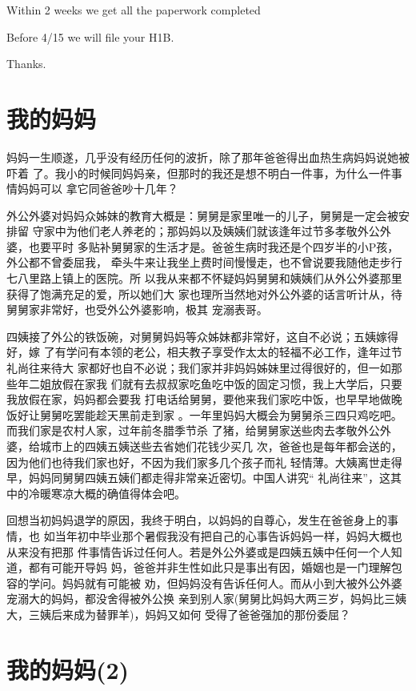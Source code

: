 \documentclass[12pt]{book}
\begin{document}
Within 2 weeks we get all the paperwork completed

Before 4/15 we will file your H1B.

Thanks.

\section{我的妈妈}
\label{sec-9-52}

妈妈一生顺遂，几乎没有经历任何的波折，除了那年爸爸得出血热生病妈妈说她被吓着
了。我小的时候同妈妈亲，但那时的我还是想不明白一件事，为什么一件事情妈妈可以
拿它同爸爸吵十几年？

外公外婆对妈妈众姊妹的教育大概是：舅舅是家里唯一的儿子，舅舅是一定会被安排留
守家中为他们老人养老的；那妈妈以及姨姨们就该逢年过节多孝敬外公外婆，也要平时
多贴补舅舅家的生活才是。爸爸生病时我还是个四岁半的小P孩，外公都不曾委屈我，
牵头牛来让我坐上费时间慢慢走，也不曾说要我随他走步行七八里路上镇上的医院。所
以我从来都不怀疑妈妈舅舅和姨姨们从外公外婆那里获得了饱满充足的爱，所以她们大
家也理所当然地对外公外婆的话言听计从，待舅舅家非常好，也受外公外婆影响，极其
宠溺表哥。

四姨接了外公的铁饭碗，对舅舅妈妈等众姊妹都非常好，这自不必说；五姨嫁得好，嫁
了有学问有本领的老公，相夫教子享受作太太的轻福不必工作，逢年过节礼尚往来待大
家都好也自不必说；我们家并非妈妈姊妹里过得很好的，但一如那些年二姐放假在家我
们就有去叔叔家吃鱼吃中饭的固定习惯，我上大学后，只要我放假在家，妈妈都会要我
打电话给舅舅，要他来我们家吃中饭，也早早地做晚饭好让舅舅吃罢能趁天黑前走到家
。一年里妈妈大概会为舅舅杀三四只鸡吃吧。而我们家是农村人家，过年前冬腊季节杀
了猪，给舅舅家送些肉去孝敬外公外婆，给城市上的四姨五姨送些去省她们花钱少买几
次，爸爸也是每年都会送的，因为他们也待我们家也好，不因为我们家多几个孩子而礼
轻情薄。大姨离世走得早，妈妈同舅舅四姨五姨们都走得非常亲近密切。中国人讲究“
礼尚往来”，这其中的冷暖寒凉大概的确值得体会吧。

回想当初妈妈退学的原因，我终于明白，以妈妈的自尊心，发生在爸爸身上的事情，也
如当年初中毕业那个暑假我没有把自己的心事告诉妈妈一样，妈妈大概也从来没有把那
件事情告诉过任何人。若是外公外婆或是四姨五姨中任何一个人知道，都有可能开导妈
妈，爸爸并非生性如此只是事出有因，婚姻也是一门理解包容的学问。妈妈就有可能被
劝，但妈妈没有告诉任何人。而从小到大被外公外婆宠溺大的妈妈，都没舍得被外公换
亲到别人家(舅舅比妈妈大两三岁，妈妈比三姨大，三姨后来成为替罪羊)，妈妈又如何
受得了爸爸强加的那份委屈？
\section{我的妈妈(2)}
\label{sec-9-53}
\end{document}
